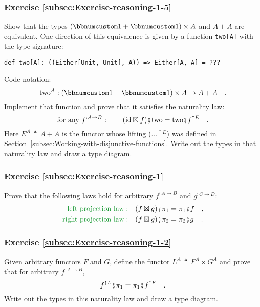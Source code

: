 \subsubsection{Exercise \label{subsec:Exercise-reasoning-1-5}\ref{subsec:Exercise-reasoning-1-5}}

Show that the types $(\bbnum 1+\bbnum 1)\times A$ and $A+A$ are
equivalent. One direction of this equivalence is given by a function
\lstinline!two[A]! with the type signature:
\begin{lstlisting}
def two[A]: ((Either[Unit, Unit], A)) => Either[A, A] = ???
\end{lstlisting}
Code notation:
\[
\text{two}^{A}:(\bbnum 1+\bbnum 1)\times A\rightarrow A+A\quad.
\]
Implement that function and prove that it satisfies the naturality
law: 
\[
\text{for any }f^{:A\rightarrow B}:\quad\quad(\text{id}\boxtimes f)\bef\text{two}=\text{two}\bef f^{\uparrow E}\quad.
\]
Here $E^{A}\triangleq A+A$ is the functor whose lifting ($...^{\uparrow E}$)
was defined in Section~\ref{subsec:Working-with-disjunctive-functions}.
Write out the types in that naturality law and draw a type diagram. 

\subsubsection{Exercise \label{subsec:Exercise-reasoning-1}\ref{subsec:Exercise-reasoning-1}}

Prove that the following laws hold for arbitrary $f^{:A\rightarrow B}$
and $g^{:C\rightarrow D}$:
\begin{align*}
{\color{greenunder}\text{left projection law}:}\quad & (f\boxtimes g)\bef\pi_{1}=\pi_{1}\bef f\quad,\\
{\color{greenunder}\text{right projection law}:}\quad & (f\boxtimes g)\bef\pi_{2}=\pi_{2}\bef g\quad.
\end{align*}


\subsubsection{Exercise \label{subsec:Exercise-reasoning-1-2}\ref{subsec:Exercise-reasoning-1-2}}

Given arbitrary functors $F$ and $G$, define the functor $L^{A}\triangleq F^{A}\times G^{A}$
and prove that for arbitrary $f^{:A\rightarrow B}$,
\[
f^{\uparrow L}\bef\pi_{1}=\pi_{1}\bef f^{\uparrow F}\quad.
\]
Write out the types in this naturality law and draw a type diagram. 

